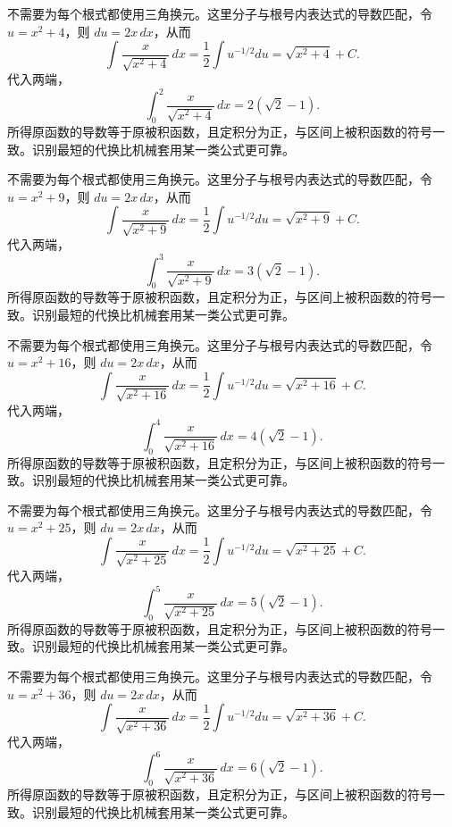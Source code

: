 \documentclass[12pt,fontset=fandol]{ctexart}
\begin{document}
\begin{solve}\label{ans:c14q20}
不需要为每个根式都使用三角换元。这里分子与根号内表达式的导数匹配，令 $u=x^2+4$，则 $du=2x\,dx$，从而
\[
\int\frac{x}{\sqrt{x^2+4}}\,dx=\frac12\int u^{-1/2}du=\sqrt{x^2+4}+C.
\]
代入两端，
\[
\int_0^{2}\frac{x}{\sqrt{x^2+4}}\,dx=2(\sqrt2-1).
\]
所得原函数的导数等于原被积函数，且定积分为正，与区间上被积函数的符号一致。识别最短的代换比机械套用某一类公式更可靠。
\end{solve}

\begin{solve}\label{ans:c14q21}
不需要为每个根式都使用三角换元。这里分子与根号内表达式的导数匹配，令 $u=x^2+9$，则 $du=2x\,dx$，从而
\[
\int\frac{x}{\sqrt{x^2+9}}\,dx=\frac12\int u^{-1/2}du=\sqrt{x^2+9}+C.
\]
代入两端，
\[
\int_0^{3}\frac{x}{\sqrt{x^2+9}}\,dx=3(\sqrt2-1).
\]
所得原函数的导数等于原被积函数，且定积分为正，与区间上被积函数的符号一致。识别最短的代换比机械套用某一类公式更可靠。
\end{solve}

\begin{solve}\label{ans:c14q22}
不需要为每个根式都使用三角换元。这里分子与根号内表达式的导数匹配，令 $u=x^2+16$，则 $du=2x\,dx$，从而
\[
\int\frac{x}{\sqrt{x^2+16}}\,dx=\frac12\int u^{-1/2}du=\sqrt{x^2+16}+C.
\]
代入两端，
\[
\int_0^{4}\frac{x}{\sqrt{x^2+16}}\,dx=4(\sqrt2-1).
\]
所得原函数的导数等于原被积函数，且定积分为正，与区间上被积函数的符号一致。识别最短的代换比机械套用某一类公式更可靠。
\end{solve}

\begin{solve}\label{ans:c14q23}
不需要为每个根式都使用三角换元。这里分子与根号内表达式的导数匹配，令 $u=x^2+25$，则 $du=2x\,dx$，从而
\[
\int\frac{x}{\sqrt{x^2+25}}\,dx=\frac12\int u^{-1/2}du=\sqrt{x^2+25}+C.
\]
代入两端，
\[
\int_0^{5}\frac{x}{\sqrt{x^2+25}}\,dx=5(\sqrt2-1).
\]
所得原函数的导数等于原被积函数，且定积分为正，与区间上被积函数的符号一致。识别最短的代换比机械套用某一类公式更可靠。
\end{solve}

\begin{solve}\label{ans:c14q24}
不需要为每个根式都使用三角换元。这里分子与根号内表达式的导数匹配，令 $u=x^2+36$，则 $du=2x\,dx$，从而
\[
\int\frac{x}{\sqrt{x^2+36}}\,dx=\frac12\int u^{-1/2}du=\sqrt{x^2+36}+C.
\]
代入两端，
\[
\int_0^{6}\frac{x}{\sqrt{x^2+36}}\,dx=6(\sqrt2-1).
\]
所得原函数的导数等于原被积函数，且定积分为正，与区间上被积函数的符号一致。识别最短的代换比机械套用某一类公式更可靠。
\end{solve}
\end{document}
